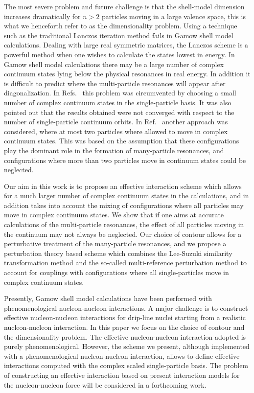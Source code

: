 The most severe problem and future challenge is that the 
shell-model dimension increases dramatically for $n > 2$
particles moving in a large valence space, 
this is what we henceforth refer to as the dimensionality problem.
Using a technique such as the traditional Lanczos iteration method \cite{lanczo}
fails in Gamow shell model calculations.
Dealing with large real symmetric matrices, the Lanczos scheme is a powerful 
method when one wishes to calculate the states lowest in energy.
In Gamow shell model calculations there may be  a large 
number of complex continuum states
lying below the physical resonances in real energy.
In addition it is difficult to
predict where the multi-particle resonances will appear after diagonalization. 
In Refs.~\cite{witek1,witek2} this problem was circumvented by 
choosing a small number of complex continuum states in the single-particle basis. 
It was also pointed out that the results obtained 
were not converged with respect to the number of single-particle continuum orbits.
In Ref.~\cite{michel2} another approach was considered, where at
most two particles where allowed to move in complex continuum states.
This was based on the assumption that these configurations play the dominant
role in the formation of many-particle resonances, and configurations where
more than two particles move in continuum states could be neglected.

Our aim in this work is to propose an effective interaction scheme 
which allows for a much larger number of complex continuum states in the calculations, 
and in addition takes into account the mixing of 
configurations where all particles may move in 
complex continuum states. We show that
if one aims at accurate calculations of the multi-particle resonances,
the effect of all particles moving in the continuum may not always be
neglected. Our choice of contour
allows for a perturbative treatment of the many-particle resonances, 
and we propose a perturbation theory based scheme which combines 
the Lee-Suzuki similarity transformation  
method \cite{suzuki1,suzuki2,suzuki3,suzuki4}
and the so-called  multi-reference perturbation method \cite{multi1,multi2,multi3}
to account for couplings
with configurations where all single-particles move in complex continuum states.

Presently, Gamow shell model calculations have been performed with phenomenological 
nucleon-nucleon interactions. A major challenge is to construct
effective nucleon-nucleon interactions for drip-line nuclei starting from 
a realistic nucleon-nucleon interaction. 
In this paper we focus on the choice of contour and the dimensionality
problem. The effective nucleon-nucleon interaction adopted is purely
phenomenological. 
However, the scheme we present, although implemented with a phenomenological 
nucleon-nucleon interaction, allows to define effective interactions computed with the 
complex scaled single-particle basis.
The problem of constructing an effective interaction based on present interaction models
for the nucleon-nucleon force will be considered in a forthcoming work.

